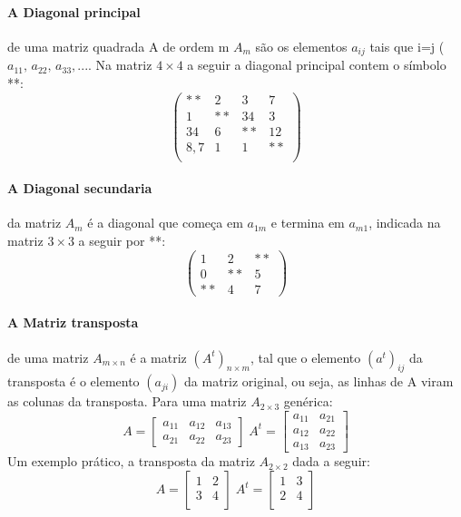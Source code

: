 \paragraph*{A Diagonal principal} de uma matriz quadrada A de ordem m $A_m$ são os elementos $a_{ij}$ tais que i=j ($a_{11},\, a_{22},\, a_{33},...$. Na matriz $4 \times 4$ a seguir a diagonal principal contem o símbolo **:
\begin{displaymath}
\begin{pmatrix}
** & 2 & 3 & 7\\
1 & ** & 34 & 3\\
34 & 6 & ** & 12\\
8,7 & 1 & 1 & ** \\
\end{pmatrix}
\end{displaymath}
\paragraph*{A Diagonal secundaria} da matriz $A_m$ é a diagonal que começa em $ a_{1m} $ e termina em $ a_{m1} $, indicada na matriz $ 3 \times 3 $ a seguir por **:
\begin{displaymath}
\begin{pmatrix}
1 & 2 & **\\
0 & ** & 5 \\
** & 4 & 7
\end{pmatrix}
\end{displaymath}
\paragraph{A Matriz transposta} de uma matriz $A_{m\times n}$ é a matriz $(A^t)_{n\times m}$, tal que
o elemento $(a^t)_{ij}$ da transposta é o elemento $(a_{ji})$ da matriz original, ou seja, as linhas de A viram as colunas da transposta.
Para uma matriz $A_{2 \times 3}$ genérica:
\begin{displaymath}
  A=
  \begin{bmatrix}
  a_{11} & a_{12} & a_{13} \\ 
  a_{21} & a_{22} & a_{23}
  \end{bmatrix}
  \; A^t=
  \begin{bmatrix}
  a_{11} & a_{21} \\ 
  a_{12} & a_{22} \\
  a_{13} & a_{23}
  \end{bmatrix}
\end{displaymath}
Um exemplo prático, a transposta da matriz $A_{2 \times 2}$ dada a seguir:
\[ A=
\begin{bmatrix}
1 & 2 \\ 3 & 4 \\
\end{bmatrix}
 \; A^t=
 \begin{bmatrix}
   1 & 3 \\ 2 & 4 \\
 \end{bmatrix}
 \]
